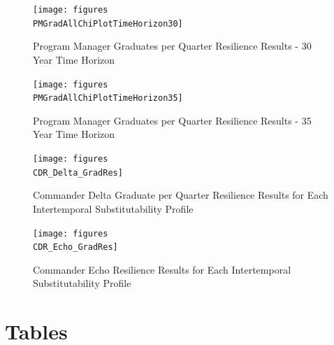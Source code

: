 \begin{figure}[h]
  \centering\texttt{[image: figures\\PMGradAllChiPlotTimeHorizon30]}
  \caption{Program Manager Graduates per Quarter Resilience Results  - 30 Year Time Horizon}
  \label{f:PMresultsGradAllChi30}
\end{figure}

\begin{figure}[h]
  \centering\texttt{[image: figures\\PMGradAllChiPlotTimeHorizon35]}
  \caption{Program Manager Graduates per Quarter Resilience Results - 35 Year Time Horizon}
  \label{f:PMresultsGradAllChi35}
\end{figure}
\begin{figure}[h]
  \centering\texttt{[image: figures\\CDR\_Delta\_GradRes]}
  \caption{Commander Delta Graduate per Quarter Resilience Results for
  Each Intertemporal Substitutability Profile}
  \label{f:CO_D_Grad}
\end{figure}

\begin{figure}[h]
  \centering\texttt{[image: figures\\CDR\_Echo\_GradRes]}
  \caption{Commander Echo Resilience Results for
  Each Intertemporal Substitutability Profile}
  \label{f:CO_E_Grad}
\end{figure}





\pagebreak
\section*{Tables}

%


%




